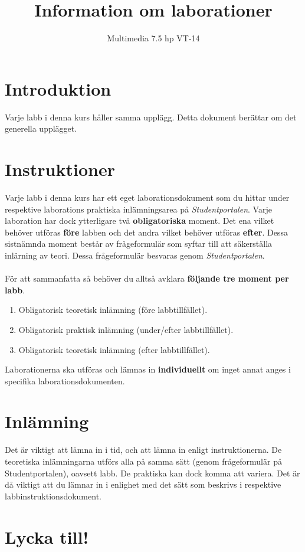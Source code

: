 \documentclass[12pt]{article}
\date{}
\title{ Information om laborationer }
\author{ Multimedia 7.5 hp VT-14 }
\begin{document}
\maketitle
\vspace{-2em}



\section{Introduktion}
Varje labb i denna kurs håller samma upplägg. Detta dokument berättar om det generella upplägget.

\section{Instruktioner}
Varje labb i denna kurs har ett eget laborationsdokument som du hittar under respektive laborations praktiska inlämningsarea på \emph{Studentportalen}. Varje laboration har dock ytterligare två \textbf{obligatoriska} moment. Det ena vilket behöver utföras \textbf{före} labben och det andra vilket behöver utföras \textbf{efter}. Dessa sistnämnda moment består av frågeformulär som syftar till att säkerställa inlärning av teori. Dessa frågeformulär besvaras genom \emph{Studentportalen}.

  \paragraph{}
  För att sammanfatta så behöver du alltså avklara \textbf{följande tre moment per labb}.

  \begin{enumerate}
    \item Obligatorisk teoretisk inlämning (före labbtillfället).
    \item Obligatorisk praktisk inlämning (under/efter labbtillfället).
    \item Obligatorisk teoretisk inlämning (efter labbtillfället).
  \end{enumerate}

Laborationerna ska utföras och lämnas in \textbf{individuellt} om inget annat anges i specifika laborationsdokumenten.

\section{Inlämning}
Det är viktigt att lämna in i tid, och att lämna in enligt instruktionerna. De teoretiska inlämningarna utförs alla på samma sätt (genom frågeformulär på Studentportalen), oavsett labb. De praktiska kan dock komma att variera. Det är då viktigt att du lämnar in i enlighet med det sätt som beskrivs i respektive labbinstruktionsdokument.

\section{Lycka till!}
\end{document}
